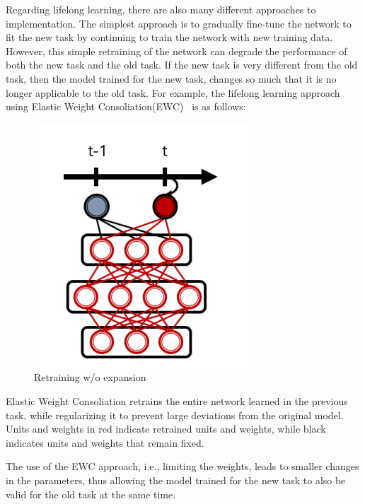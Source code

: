 Regarding lifelong learning, there are also many different approaches to implementation. The simplest approach is to gradually fine-tune the network to fit the new task by continuing to train the network with new training data. However, this simple retraining of the network can degrade the performance of both the new task and the old task. If the new task is very different from the old task, then the model trained for the new task, changes so much that it is no longer applicable to the old task. For example, the lifelong learning approach using  Elastic Weight Consoliation(EWC)~\cite{kirkpatrick2017overcoming} is as follows:
\begin{figure}[H]
	\centering
	\includegraphics[width=1\linewidth]{figures_ning/ewc}
	\caption[Retraining w/o expansion]{Retraining w/o expansion}
	\label{fig:ewc}
\end{figure}
Elastic Weight Consoliation retrains the entire network learned in the previous task, while regularizing it to prevent large deviations from the original model. Units and weights in red indicate retrained units and weights, while black indicates units and weights that remain fixed.

The use of the EWC approach, i.e., limiting the weights, leads to smaller changes in the parameters, thus allowing the model trained for the new task to also be valid for the old task at the same time.

